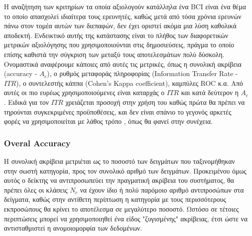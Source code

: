 \documentclass[11pt,a4paper,english,greek,twoside]{../Thesis}
\begin{document}
  \par Η αναζήτηση των κριτηρίων τα οποία αξιολογούν κατάλληλα ένα BCI είναι ένα θέμα το οποίο απασχολεί ιδιαίτερα τους ερευνητές, καθώς μετά από τόσα χρόνια ερευνών πάνω στον τομέα αυτών των διεπαφών, δεν έχει οριστεί ακόμα μια λύση καθολικά αποδεκτή. Ενδεικτικό αυτής της κατάστασης είναι το πλήθος των διαφορετικών μετρικών αξιολόγησης που χρησιμοποιούνται στις δημοσιεύσεις, πράγμα το οποίο επίσης καθιστά την σύγκριση των μεταξύ τους αποτελεσμάτων πολύ δύσκολη. Ονομαστικά αναφέρουμε κάποιες από αυτές τις μετρικές, όπως η συνολική ακρίβεια (accuracy - $A_c$), ο ρυθμός μεταφοράς πληροφορίας (Information Transfer Rate - $ITR$), ο συντελεστής κάππα (Cohen’s Kappa coefficient), καμπύλες ROC κ.α. Από αυτές οι πιο ευρέως χρησιμοποιούμενες είναι καταρχάς ο $ITR$ \cite{McFarland2012-pp} και κατά δεύτερον η $A_c$. Ειδικά για τον $ITR$ χρειάζεται προσοχή στην χρήση του καθώς πρώτα θα πρέπει να τηρούνται συγκεκριμένες προϋποθέσεις, και δεν είναι σπάνιο το γεγονός αρκετές φορές να χρησιμοποιείται με λάθος τρόπο \cite{Yuan2013-jp}, όπως θα φανεί στην συνέχεια.
  
  \subsubsection{Overal Accuracy}
  Η συνολική ακρίβεια μετριέται ως το ποσοστό των δειγμάτων που ταξινομήθηκαν στην σωστή κατηγορία, προς τον συνολικό αριθμό των δειγμάτων. Προκειμένου όμως αυτός ο δείκτης να αντιπροσωπεύει την πραγματική ακρίβεια του συστήματος, θα πρέπει όλες οι κλάσεις $N_c$ να έχουν ίδιο ή πολύ παρόμοιο αριθμό αντιπροσώπων στα δείγματα, καθώς στην αντίθετη περίπτωση η κατηγορία με τους περισσότερους εκπροσώπους θα κρίνει το αποτέλεσμα σε μεγαλύτερο ποσοστό. Ωστόσο σε τέτοιες περιπτώσεις μπορεί να χρησιμοποιηθεί ένα είδος "ζυγισμένης" ακρίβειας, έτσι ώστε να αντισταθμιστεί η ανομοιομορφία των δεδομένων.
  
\end{document}
